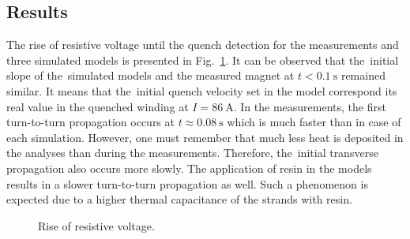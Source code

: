 \subsection{Results}

The rise of resistive voltage until the quench detection for the measurements and three simulated models is presented in Fig.~\ref{fig: quench_detection_v_res}. It can be observed that the~initial slope of the~simulated models and the measured magnet at $t < 0.1~\text{s}$ remained similar. It means that the~initial quench velocity set in the model correspond its real value in the quenched winding at $I=86~\text{A}$. In the measurements, the first turn-to-turn propagation occurs at $t \approx 0.08~\text{s}$ which is much faster than in case of each simulation. However, one must remember that much less heat is deposited in the analyses than during the measurements. Therefore, the~initial transverse propagation also occurs more slowly. The application of resin in the models results in a slower turn-to-turn propagation as well. Such a phenomenon is expected due to a higher thermal capacitance of the strands with resin. 

\begin{figure}[H]
    \centering
    \caption{Rise of resistive voltage.}
    \label{fig: quench_detection_v_res}
\end{figure}

